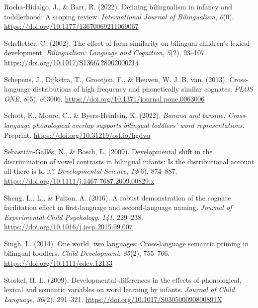 \documentclass[
  ,man,floatsintext]{apa6}
\newlength{\cslhangindent}
\newlength{\cslentryspacingunit} %
\newenvironment{CSLReferences}[2] %
 {%
  \setlength{\parindent}{0pt}
  \ifodd #1
  \let\oldpar\par
  \def\par{\hangindent=\cslhangindent\oldpar}
  \fi
  \setlength{\parskip}{#2\cslentryspacingunit}
 }%
 {}
\begin{document}
\begin{CSLReferences}{1}{0}
\leavevmode{}%
Rocha-Hidalgo, J., \& Barr, R. (2022). Defining bilingualism in infancy and toddlerhood: A scoping review. \emph{International Journal of Bilingualism}, \emph{0}(0). \url{https://doi.org/10.1177/13670069211069067}

\leavevmode{}%
Schelletter, C. (2002). The effect of form similarity on bilingual children's lexical development. \emph{Bilingualism: Language and Cognition}, \emph{5}(2), 93--107. \url{https://doi.org/10.1017/S1366728902000214}

\leavevmode{}%
Schepens, J., Dijkstra, T., Grootjen, F., \& Heuven, W. J. B. van. (2013). Cross-language distributions of high frequency and phonetically similar cognates. \emph{PLOS ONE}, \emph{8}(5), e63006. \url{https://doi.org/10.1371/journal.pone.0063006}

\leavevmode{}%
Schott, E., Moore, C., \& Byers-Heinlein, K. (2022). \emph{Banana and banane: Cross-language phonological overlap supports bilingual toddlers' word representations}. Preprint. \url{https://doi.org/10.31219/osf.io/hgdvq}

\leavevmode{}%
Sebastián-Gallés, N., \& Bosch, L. (2009). Developmental shift in the discrimination of vowel contrasts in bilingual infants: Is the distributional account all there is to it? \emph{Developmental Science}, \emph{12}(6), 874--887. \url{https://doi.org/10.1111/j.1467-7687.2009.00829.x}

\leavevmode{}%
Sheng, L., L., \& Fulton, A. (2016). A robust demonstration of the cognate facilitation effect in first-language and second-language naming. \emph{Journal of Experimental Child Psychology}, \emph{141}, 229--238. \url{https://doi.org/10.1016/j.jecp.2015.09.007}

\leavevmode{}%
Singh, L. (2014). One world, two languages: Cross-language semantic priming in bilingual toddlers. \emph{Child Development}, \emph{85}(2), 755--766. \url{https://doi.org/10.1111/cdev.12133}

\leavevmode{}%
Storkel, H. L. (2009). Developmental differences in the effects of phonological, lexical and semantic variables on word learning by infants. \emph{Journal of Child Language}, \emph{36}(2), 291--321. \url{https://doi.org/10.1017/S030500090800891X}


\end{CSLReferences}
\end{document}
